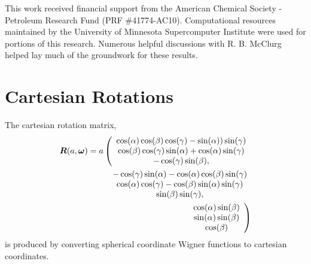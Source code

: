 \documentclass[preprint]{revtex4}              %
\newcommand{\mb}[1]{\ensuremath{\mbox{\boldmath $ #1 $}}}
\begin{document}
This work received financial support from the American Chemical
Society - Petroleum Research Fund (PRF \#41774-AC10). Computational resources maintained by the University of Minnesota
Supercomputer Institute were used for portions of this research. Numerous helpful discussions with R. B. McClurg helped lay much of the groundwork for these results.

\appendix

\section{Cartesian Rotations}
\label{cartRot}

The cartesian rotation matrix,
\begin{eqnarray}
\mb{R}(a,\mb{\omega})=a\left(\begin{array}{c}\cos(\alpha)\cos(\beta)\cos(\gamma)
- \sin(\alpha))\sin(\gamma) \\
\cos(\beta)\cos(\gamma)\sin(\alpha) + \cos(\alpha)\sin(\gamma) \\
    -\cos(\gamma) \sin(\beta),\end{array} \right. \nonumber\\
%
\begin{array}{c}-\cos(\gamma)\sin(\alpha)-\cos(\alpha) \cos(\beta) \sin(\gamma)\\
\cos(\alpha)\cos(\gamma) - \cos(\beta)\sin(\alpha)\sin(\gamma) \\
    \sin(\beta) \sin(\gamma),\end{array} \nonumber\\
%
\left. \begin{array}{c}\cos(\alpha) \sin(\beta)\\
\sin(\alpha) \sin(\beta)\\
    \cos(\beta)\end{array}\right)
\end{eqnarray}
is produced by converting spherical coordinate Wigner functions to
cartesian coordinates.


\end{document}
